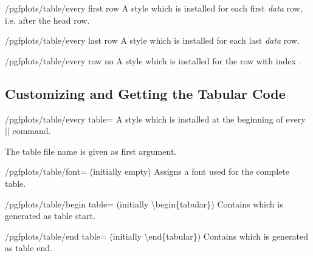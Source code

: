 \begin{stylekey}{/pgfplots/table/every first row}	
	A style which is installed for each first \emph{data} row, i.e. after the head row.
\end{stylekey}

\begin{stylekey}{/pgfplots/table/every last row}	
	A style which is installed for each last \emph{data} row.
\end{stylekey}

\begin{stylekey}{/pgfplots/table/every row no }	
	A style which is installed for the row with index .
\end{stylekey}

\subsection{Customizing and Getting the Tabular Code}
\begin{stylekey}{/pgfplots/table/every table=}
	A style which is installed at the beginning of every |\pgfplotstabletypeset| command.

	The table file name is given as first argument.
\end{stylekey}

\begin{key}{/pgfplots/table/font= (initially empty)}
	Assigns a font used for the complete table.
\end{key}

\begin{key}{/pgfplots/table/begin table= (initially \textbackslash begin\{tabular\})}
	Contains  which is generated as table start.
\end{key}
\begin{key}{/pgfplots/table/end table= (initially \textbackslash end\{tabular\})}
	Contains  which is generated as table end.
\end{key}


